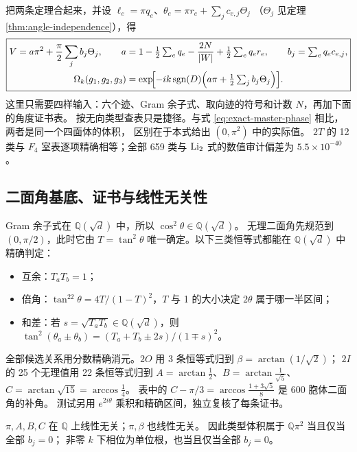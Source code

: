 把两条定理合起来，并设 $\ell_e=\pi q_e$、$\theta_e=\pi r_e+\sum_jc_{e,j}\Theta_j$
（$\Theta_j$ 见定理 \ref{thm:angle-independence}），得
\begin{equation}
\boxed{\begin{gathered}
V=a\pi^2+\frac\pi2\sum_jb_j\Theta_j,\qquad
a=1-\tfrac12\textstyle\sum_eq_e-\dfrac{2N}{|W|}+\tfrac12\sum_eq_er_e,\qquad
b_j=\textstyle\sum_eq_ec_{e,j},\\
\Omega_k(g_1,g_2,g_3)=\exp\!\Bigl[-ik\operatorname{sgn}(D)\Bigl(a\pi+\tfrac12\textstyle\sum_jb_j\Theta_j\Bigr)\Bigr].
\end{gathered}}\label{eq:polar-master}
\end{equation}
这里只需要四样输入：六个迹、Gram 余子式、取向迹的符号和计数 $N$，再加下面的角度证书表。
按无向类型查表只是捷径。与式 \eqref{eq:exact-master-phase} 相比，两者是同一个四面体的体积，
区别在于本式给出 $(0,\pi^2)$ 中的实际值。
$2T$ 的 12 类与 $F_4$ 室表逐项精确相等；全部 659 类与 $\operatorname{Li}_2$ 式的数值审计偏差为 $5.5\times10^{-40}$。

\subsection{二面角基底、证书与线性无关性}

Gram 余子式在 $\mathbb Q(\sqrt d)$ 中，所以 $\cos^2\theta\in\mathbb Q(\sqrt d)$。
无理二面角先规范到 $(0,\pi/2)$，此时它由 $T=\tan^2\theta$ 唯一确定。以下三类恒等式都能在 $\mathbb Q(\sqrt d)$ 中精确判定：
\begin{itemize}
\item 互余：$T_aT_b=1$；
\item 倍角：$\tan^22\theta=4T/(1-T)^2$，$T$ 与 1 的大小决定 $2\theta$ 属于哪一半区间；
\item 和差：若 $s=\sqrt{T_aT_b}\in\mathbb Q(\sqrt d)$，则 $\tan^2(\theta_a\pm\theta_b)=(T_a+T_b\pm2s)/(1\mp s)^2$。
\end{itemize}
全部候选关系用分数精确消元。$2O$ 用 3 条恒等式归到 $\beta=\arctan(1/\sqrt2)$；
$2I$ 的 25 个无理值用 22 条恒等式归到
$A=\arctan\frac12$、$B=\arctan\frac1{\sqrt5}$、$C=\arctan\sqrt{15}=\arccos\frac14$。
表中的 $C-\pi/3=\arccos\frac{1+3\sqrt5}{8}$ 是 600 胞体二面角的补角。
测试另用 $e^{2i\theta}$ 乘积和精确区间，独立复核了每条证书。



\begin{theorem}\label{thm:angle-independence}
$\pi,A,B,C$ 在 $\mathbb Q$ 上线性无关；$\pi,\beta$ 也线性无关。
因此类型体积属于 $\mathbb Q\pi^2$ 当且仅当全部 $b_j=0$；
非零 $k$ 下相位为单位根，也当且仅当全部 $b_j=0$。
\end{theorem}

